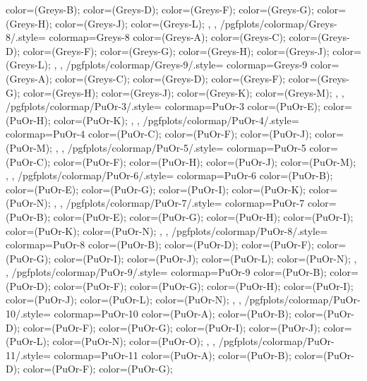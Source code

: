 {{{      color=(Greys-B);
      color=(Greys-D);
      color=(Greys-F);
      color=(Greys-G);
      color=(Greys-H);
      color=(Greys-J);
      color=(Greys-L);
    },
  },
  /pgfplots/colormap/Greys-8/.style={
    colormap={Greys-8}{
      color=(Greys-A);
      color=(Greys-C);
      color=(Greys-D);
      color=(Greys-F);
      color=(Greys-G);
      color=(Greys-H);
      color=(Greys-J);
      color=(Greys-L);
    },
  },
  /pgfplots/colormap/Greys-9/.style={
    colormap={Greys-9}{
      color=(Greys-A);
      color=(Greys-C);
      color=(Greys-D);
      color=(Greys-F);
      color=(Greys-G);
      color=(Greys-H);
      color=(Greys-J);
      color=(Greys-K);
      color=(Greys-M);
    },
  },
  /pgfplots/colormap/PuOr-3/.style={
    colormap={PuOr-3}{
      color=(PuOr-E);
      color=(PuOr-H);
      color=(PuOr-K);
    },
  },
  /pgfplots/colormap/PuOr-4/.style={
    colormap={PuOr-4}{
      color=(PuOr-C);
      color=(PuOr-F);
      color=(PuOr-J);
      color=(PuOr-M);
    },
  },
  /pgfplots/colormap/PuOr-5/.style={
    colormap={PuOr-5}{
      color=(PuOr-C);
      color=(PuOr-F);
      color=(PuOr-H);
      color=(PuOr-J);
      color=(PuOr-M);
    },
  },
  /pgfplots/colormap/PuOr-6/.style={
    colormap={PuOr-6}{
      color=(PuOr-B);
      color=(PuOr-E);
      color=(PuOr-G);
      color=(PuOr-I);
      color=(PuOr-K);
      color=(PuOr-N);
    },
  },
  /pgfplots/colormap/PuOr-7/.style={
    colormap={PuOr-7}{
      color=(PuOr-B);
      color=(PuOr-E);
      color=(PuOr-G);
      color=(PuOr-H);
      color=(PuOr-I);
      color=(PuOr-K);
      color=(PuOr-N);
    },
  },
  /pgfplots/colormap/PuOr-8/.style={
    colormap={PuOr-8}{
      color=(PuOr-B);
      color=(PuOr-D);
      color=(PuOr-F);
      color=(PuOr-G);
      color=(PuOr-I);
      color=(PuOr-J);
      color=(PuOr-L);
      color=(PuOr-N);
    },
  },
  /pgfplots/colormap/PuOr-9/.style={
    colormap={PuOr-9}{
      color=(PuOr-B);
      color=(PuOr-D);
      color=(PuOr-F);
      color=(PuOr-G);
      color=(PuOr-H);
      color=(PuOr-I);
      color=(PuOr-J);
      color=(PuOr-L);
      color=(PuOr-N);
    },
  },
  /pgfplots/colormap/PuOr-10/.style={
    colormap={PuOr-10}{
      color=(PuOr-A);
      color=(PuOr-B);
      color=(PuOr-D);
      color=(PuOr-F);
      color=(PuOr-G);
      color=(PuOr-I);
      color=(PuOr-J);
      color=(PuOr-L);
      color=(PuOr-N);
      color=(PuOr-O);
    },
  },
  /pgfplots/colormap/PuOr-11/.style={
    colormap={PuOr-11}{
      color=(PuOr-A);
      color=(PuOr-B);
      color=(PuOr-D);
      color=(PuOr-F);
      color=(PuOr-G);
}}}
